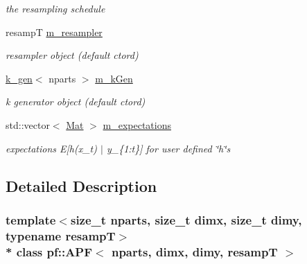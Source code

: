 \begin{DoxyCompactItemize}
\begin{DoxyCompactList}\small\item\em the resampling schedule \end{DoxyCompactList}\item 
resampT \hyperlink{classpf_1_1APF_ab758c906000a3be70a1636a91676bfcc}{m\+\_\+resampler}\hypertarget{classpf_1_1APF_ab758c906000a3be70a1636a91676bfcc}{}\label{classpf_1_1APF_ab758c906000a3be70a1636a91676bfcc}

\begin{DoxyCompactList}\small\item\em resampler object (default ctor\textquotesingle{}d) \end{DoxyCompactList}\item 
\hyperlink{classpf_1_1k__gen}{k\+\_\+gen}$<$ nparts $>$ \hyperlink{classpf_1_1APF_a796dc4e376891c5199af5fbea8e7d068}{m\+\_\+k\+Gen}\hypertarget{classpf_1_1APF_a796dc4e376891c5199af5fbea8e7d068}{}\label{classpf_1_1APF_a796dc4e376891c5199af5fbea8e7d068}

\begin{DoxyCompactList}\small\item\em k generator object (default ctor\textquotesingle{}d) \end{DoxyCompactList}\item 
std\+::vector$<$ \hyperlink{classpf_1_1APF_a771c0848fc35bf75e2d3f93bc4ee42ab}{Mat} $>$ \hyperlink{classpf_1_1APF_ae63b91d0561efab0731fc31ad1065eca}{m\+\_\+expectations}\hypertarget{classpf_1_1APF_ae63b91d0561efab0731fc31ad1065eca}{}\label{classpf_1_1APF_ae63b91d0561efab0731fc31ad1065eca}

\begin{DoxyCompactList}\small\item\em expectations E\mbox{[}h(x\+\_\+t) $\vert$ y\+\_\+\{1\+:t\}\mbox{]} for user defined \char`\"{}h\char`\"{}s \end{DoxyCompactList}\end{DoxyCompactItemize}


\subsection{Detailed Description}
\subsubsection*{template$<$size\+\_\+t nparts, size\+\_\+t dimx, size\+\_\+t dimy, typename resampT$>$\\*
class pf\+::\+A\+P\+F$<$ nparts, dimx, dimy, resamp\+T $>$}

